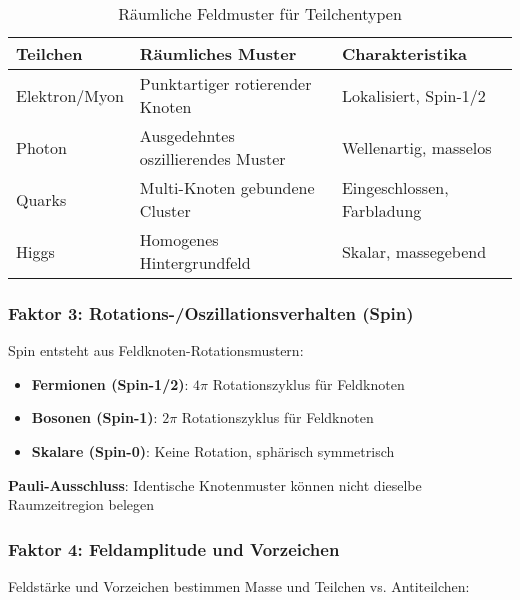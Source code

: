 \documentclass[12pt,a4paper]{article}
\newcommand{\mypi}{\ensuremath{\pi}}
\begin{document}
	\begin{table}[htbp]
		\centering
		\begin{tabular}{lp{5cm}p{4cm}}
			\toprule
			\textbf{Teilchen} & \textbf{Räumliches Muster} & \textbf{Charakteristika} \\
			\midrule
			Elektron/Myon & Punktartiger rotierender Knoten & Lokalisiert, Spin-1/2 \\
			Photon & Ausgedehntes oszillierendes Muster & Wellenartig, masselos \\
			Quarks & Multi-Knoten gebundene Cluster & Eingeschlossen, Farbladung \\
			Higgs & Homogenes Hintergrundfeld & Skalar, massegebend \\
			\bottomrule
		\end{tabular}
		\caption{Räumliche Feldmuster für Teilchentypen}
		\label{tab:raeumliche_feldmuster}
	\end{table}
	
	\subsubsection{Faktor 3: Rotations-/Oszillationsverhalten (Spin)}
	\label{subsubsec:spin_verhalten}
	
	Spin entsteht aus Feldknoten-Rotationsmustern:
	
	\begin{tcolorbox}[colback=green!5!white,colframe=green!75!black,title=Spin aus Feldknoten-Rotation]
		\begin{itemize}
			\item \textbf{Fermionen (Spin-1/2)}: $4\mypi$ Rotationszyklus für Feldknoten
			\item \textbf{Bosonen (Spin-1)}: $2\mypi$ Rotationszyklus für Feldknoten
			\item \textbf{Skalare (Spin-0)}: Keine Rotation, sphärisch symmetrisch
		\end{itemize}
		
		\textbf{Pauli-Ausschluss}: Identische Knotenmuster können nicht dieselbe Raumzeitregion belegen
	\end{tcolorbox}
	
	\subsubsection{Faktor 4: Feldamplitude und Vorzeichen}
	\label{subsubsec:feldamplitude}
	
	Feldstärke und Vorzeichen bestimmen Masse und Teilchen vs. Antiteilchen:
	
\end{document}
